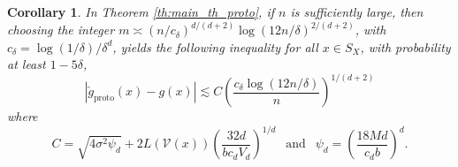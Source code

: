 \documentclass[paper=a4, fontsize=11pt]{scrartcl}
\newtheorem{corollary}[theorem]{Corollary}
\begin{document}
%
%
%


\begin{corollary}\label{cor:main_th_proto}
In Theorem \ref{th:main_th_proto}, if $n$ is sufficiently large, then choosing the integer $m \asymp (n/c_\delta) ^{d/(d+2)} \log(12n/\delta)^{2/(d+2)}$, with $c_\delta =  \log(1/\delta) / \delta^d $, yields the following inequality for all $x\in S_X$, with probability at least $1-5\delta$,
    $$|\hat g_{\textrm{proto}} (x) - g(x) | \lesssim  C \left( \frac{c_\delta \log(12n/\delta)}{n }\right)^{1/(d+2)}$$
    where $$C = \sqrt{4\sigma^2 \psi_d} +  2 L(\mathcal{V}(x)) \left(\dfrac{ 32d }{ b c_d V_d }\right)^{1/d}  \ \ \text{   and   } \ \ \psi_d =  \left(\dfrac{18Md}{c_d b}\right)^d.$$
\end{corollary}
\end{document}
